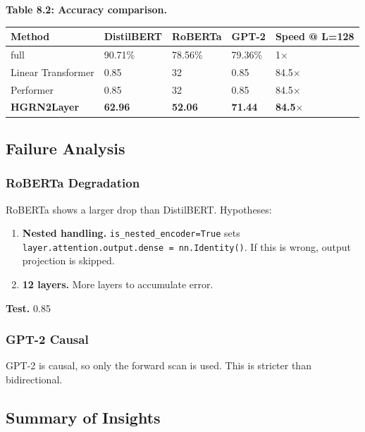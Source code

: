 \textbf{Table 8.2: Accuracy comparison.}

\begin{table}[H]
\centering
\small
\begin{tabular}{lllll}
\toprule
\textbf{Method} & \textbf{DistilBERT} & \textbf{RoBERTa} & \textbf{GPT-2} & \textbf{Speed @ L=128} \\
\midrule
full & 90.71\% & 78.56\% & 79.36\% & 1$\times$ \\
Linear Transformer & 0.85 & 32 & 0.85 & 84.5$\times$ \\
Performer & 0.85 & 32 & 0.85 & 84.5$\times$ \\
\textbf{HGRN2Layer} & \textbf{62.96} & \textbf{52.06} & \textbf{71.44} & \textbf{84.5$\times$} \\
\bottomrule
\end{tabular}
\end{table}

\subsection{Failure Analysis}

\subsubsection{RoBERTa Degradation}

RoBERTa shows a larger drop than DistilBERT. Hypotheses:

\begin{enumerate}
\item \textbf{Nested handling.} \texttt{is\_nested\_encoder=True} sets
  \texttt{layer.attention.output.dense = nn.Identity()}. If this is wrong,
  output projection is skipped.
\item \textbf{12 layers.} More layers to accumulate error.

\end{enumerate}
\textbf{Test.} 0.85

\subsubsection{GPT-2 Causal}

GPT-2 is causal, so only the forward scan is used. This is stricter than 
bidirectional.

\subsection{Summary of Insights}

